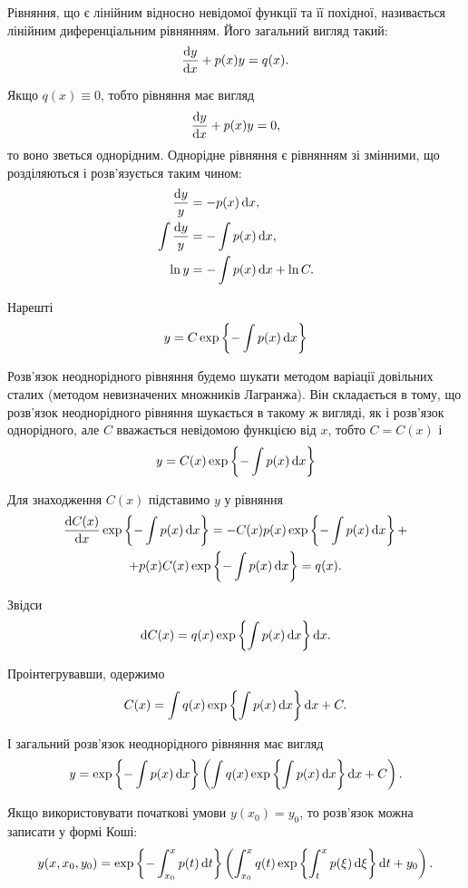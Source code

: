 Рівняння, що є лінійним відносно невідомої функції та її похідної, називається лінійним диференціальним рівнянням. Його загальний вигляд такий:
\begin{equation*}
	\frac{\mathop{}\!\mathrm{d} y}{\mathop{}\!\mathrm{d} x} + p(x) y = q(x).
\end{equation*}

Якщо $q(x) \equiv 0$, тобто рівняння має вигляд
\begin{equation*}
	\frac{\mathop{}\!\mathrm{d} y}{\mathop{}\!\mathrm{d} x} + p(x) y = 0,
\end{equation*}
то воно зветься однорідним. Однорідне рівняння є рівнянням зі змінними, що розділяються і розв'язується таким чином:
\begin{align*}
	\frac{\mathop{}\!\mathrm{d} y}{y} &= -p(x) \mathop{}\!\mathrm{d} x, \\
	\int \frac{\mathop{}\!\mathrm{d} y}{y} &= - \int p(x) \mathop{}\!\mathrm{d} x, \\
	\ln y &= - \int p(x) \mathop{}\!\mathrm{d} x + \ln C.
\end{align*}

Нарешті 
\begin{equation*}
	y = C \exp \left\{ - \int p(x) \mathop{}\!\mathrm{d} x \right\}
\end{equation*}

Розв'язок неоднорідного рівняння будемо шукати методом варіації довільних сталих (методом невизначених множників Лагранжа). Він складається в тому, що розв'язок неоднорідного рівняння шукається в такому ж вигляді, як і розв'язок однорідного, але $C$ вважається невідомою функцією від $x$, тобто $C = C(x)$ і 
\begin{equation*}
	y = C(x) \exp \left\{ - \int p(x) \mathop{}\!\mathrm{d} x \right\}	
\end{equation*}

Для знаходження $C(x)$ підставимо $y$ у рівняння
\begin{multline*} 
	\frac{\mathop{}\!\mathrm{d} C(x)}{\mathop{}\!\mathrm{d} x} \exp \left\{ - \int p(x) \mathop{}\!\mathrm{d} x \right\} = - C(x) p(x) \exp \left\{ - \int p(x) \mathop{}\!\mathrm{d} x \right\} + \\
	+ p(x) C(x) \exp \left\{ - \int p(x) \mathop{}\!\mathrm{d} x \right\} = q(x).
\end{multline*}

Звідси
\begin{equation*} 
	\mathop{}\!\mathrm{d} C(x) = q(x) \exp \left\{\int p(x) \mathop{}\!\mathrm{d} x \right\} \mathop{}\!\mathrm{d} x.
\end{equation*}

Проінтегрувавши, одержимо
\begin{equation*} 
	C(x) = \int q(x) \exp \left\{\int p(x) \mathop{}\!\mathrm{d} x \right\} \mathop{}\!\mathrm{d} x + C.
\end{equation*}

І загальний розв'язок неоднорідного рівняння має вигляд
\begin{equation*} 
	y = \exp \left\{ - \int p(x) \mathop{}\!\mathrm{d} x \right\} \left( \int q(x) \exp \left\{\int p(x) \mathop{}\!\mathrm{d} x \right\} \mathop{}\!\mathrm{d} x + C\right).
\end{equation*}

Якщо використовувати початкові умови $y(x_0) = y_0$, то розв'язок можна записати у формі Коші:
\begin{equation*} 
	y(x, x_0, y_0) = \exp \left\{ - \int_{x_0}^x p(t) \mathop{}\!\mathrm{d} t \right\} \left( \int_{x_0}^x q(t) \exp \left\{\int_t^x p(\xi) \mathop{}\!\mathrm{d} \xi \right\} \mathop{}\!\mathrm{d} t + y_0\right).
\end{equation*}
